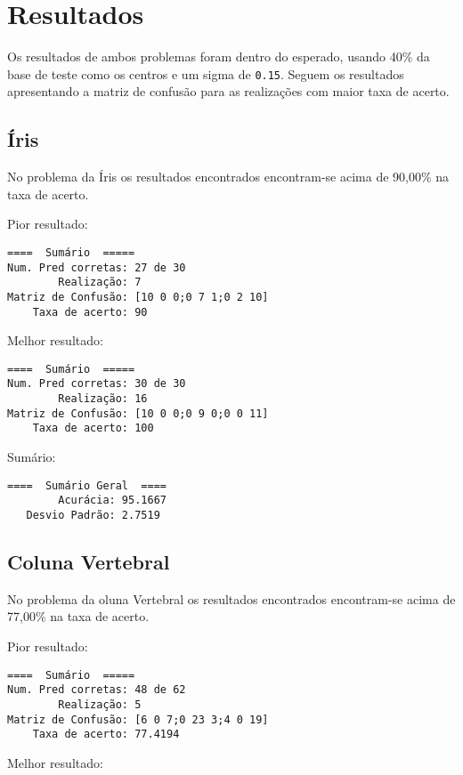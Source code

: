 \section{Resultados}

Os resultados de ambos problemas foram dentro do esperado, usando 40\%
da base de teste como os centros e um sigma de \texttt{0.15}. Seguem os
resultados apresentando a matriz de confusão para as realizações com
maior taxa de acerto.

\subsection{Íris}

No problema da Íris os resultados encontrados encontram-se acima de
90,00\% na taxa de acerto.

Pior resultado:

\begin{verbatim}
====  Sumário  =====
Num. Pred corretas: 27 de 30
        Realização: 7
Matriz de Confusão: [10 0 0;0 7 1;0 2 10]
    Taxa de acerto: 90
\end{verbatim}

Melhor resultado:

\begin{verbatim}
====  Sumário  =====
Num. Pred corretas: 30 de 30
        Realização: 16
Matriz de Confusão: [10 0 0;0 9 0;0 0 11]
    Taxa de acerto: 100
\end{verbatim}

Sumário:

\begin{verbatim}
====  Sumário Geral  ====
        Acurácia: 95.1667
   Desvio Padrão: 2.7519
\end{verbatim}

\subsection{Coluna Vertebral}

No problema da oluna Vertebral os resultados encontrados encontram-se
acima de 77,00\% na taxa de acerto.

Pior resultado:

\begin{verbatim}
====  Sumário  =====
Num. Pred corretas: 48 de 62
        Realização: 5
Matriz de Confusão: [6 0 7;0 23 3;4 0 19]
    Taxa de acerto: 77.4194
\end{verbatim}

Melhor resultado:

